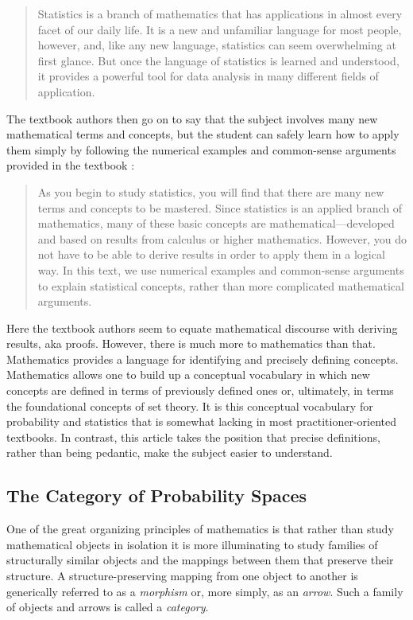 \documentclass{article}
\begin{document}
\begin{quotation}
Statistics is a branch of mathematics that has applications in almost every facet of our daily life. It is a new and unfamiliar language for most people, however, and, like any new language, statistics can seem overwhelming at first glance. But once the language of statistics is learned and understood, it provides a powerful tool for data analysis in many different fields of application.
\end{quotation}

The textbook authors then go on to say that the subject involves many new mathematical terms and concepts, 
but the student can safely learn how to apply them simply
by following the numerical examples and common-sense arguments provided in the textbook \cite[p5]{mendenhall:ips14}:

\begin{quotation}
As you begin to study statistics, you will find that there are many new terms and concepts to be mastered. Since statistics is an applied branch of mathematics, many of these basic concepts are mathematical---developed and based on results from calculus or higher mathematics. However, you do not have to be able to derive results in order to apply them in a logical way. In this text, we use numerical examples and common-sense arguments to explain statistical concepts, rather than more complicated mathematical arguments.
\end{quotation}

Here the textbook authors seem to equate mathematical discourse with deriving results, aka proofs.
However, there is much more to mathematics than that.
Mathematics provides a language for identifying and precisely defining concepts.
Mathematics allows one to build up a conceptual vocabulary in which new concepts are defined in terms of previously defined ones
or, ultimately, in terms the foundational concepts of set theory.
It is this conceptual vocabulary for probability and statistics that is somewhat lacking in most practitioner-oriented textbooks.
In contrast, this article takes the position that precise definitions, rather than being pedantic, make the subject easier to understand.

\subsection{The Category of Probability Spaces}

One of the great organizing principles of mathematics is that rather than study mathematical objects in isolation it is more illuminating to study 
families of structurally similar objects and the mappings between them that preserve their structure.
A structure-preserving mapping from one object to another is generically referred to as a {\it morphism} or, more simply, as an {\it arrow}.
Such a family of objects and arrows is called a {\it category}.
\end{document}
